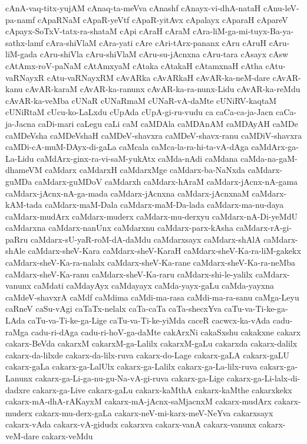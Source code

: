 {cAnA-vaq-titx-yujAM
cAnaq-ta-meVva
cAnashf
cAnayx-vi-dhA-nataH
cAnu-leV-pa-namf
cApaRNaM
cApaR-yeVtf
cApaR-yitAvx
cApalayx
cAparaH
cApareV
cApayx-SoTxV-tatx-ra-shataM
cApi
cAraH
cAraM
cAra-liM-ga-mi-tuyx-Ba-ya-sathx-lamf
cAra-shiVlaM
cAra-yati
cAre
cAri-tArx-pananx
cAru
cAruH
cAru-liM-gada
cAru-shiVla
cAru-shiVlaM
cAru-su-jAcnxna
cAru-tara
cAsayx
cAsw
cAtAmx-roV-paNaM
cAtAmxyaM
cAtaka
cAtakaH
cAtamxnaH
cAtha
cAtu-vaRNayxR
cAtu-vaRNayxRM
cAvARka
cAvARkaH
cAvAR-ka-neM-dare
cAvAR-kanu
cAvAR-karaM
cAvAR-ka-ranunx
cAvAR-ka-ra-nunx-Lidu
cAvAR-ka-reMdu
cAvAR-ka-veMba
cUNaR
cUNaRmaM
cUNaR-vA-daMte
cUNiRV-kaqtaM
cUNiRtaM
cUcu-ko-LaLxdu
cUpAda
cUpA-gi-ru-vudu
ca
caCa-ca-ja-Jacn
caCa-ja-Jacna
caDi-mari
caLegu
caLi
caM
caMDAla
caMDAnAM
caMDAyAH
caMDe
caMDeVsha
caMDeVshaH
caMDeV-shavxra
caMDeV-shavx-ranu
caMDiV-shavxra
caMDi-cA-muM-DAyx-di-gaLa
caMcala
caMca-la-ra-hi-ta-vA-dAga
caMdArx-ga-La-Lidu
caMdArx-ginx-ra-vi-saM-yukAtx
caMda-nAdi
caMdana
caMda-na-gaM-dhameVM
caMdarx
caMdarxH
caMdarxMge
caMdarx-ba-NaNxda
caMdarx-guMDa
caMdarx-guMDoV
caMdarxh
caMdarx-hAraM
caMdarx-jAcnx-nA-gama
caMdarx-jAcnx-nA-ga-mada
caMdarx-jAcnxna
caMdarx-jAcnxnaM
caMdarx-kAM-tada
caMdarx-maM-Dala
caMdarx-maM-Da-lada
caMdarx-ma-nu-daya
caMdarx-mudArx
caMdarx-muderx
caMdarx-mu-derxyu
caMdarx-nA-Di-yeMdU
caMdarxna
caMdarx-nanUnx
caMdarxnu
caMdarx-parx-kAsha
caMdarx-rA-gi-paRru
caMdarx-sU-yaR-roM-dA-daMdu
caMdarxsayx
caMdarx-shAlA
caMdarx-shAle
caMdarx-sheV-Kara
caMdarx-sheV-KaraH
caMdarx-sheV-Ka-ra-liM-gakekx
caMdarx-sheV-Ka-ra-nalalx
caMdarx-sheV-Ka-rane
caMdarx-sheV-Ka-ra-neMba
caMdarx-sheV-Ka-ranu
caMdarx-sheV-Ka-raru
caMdarx-shi-le-yalilx
caMdarx-vanunx
caMdati
caMdayAyx
caMdayayx
caMda-yayx-gaLu
caMda-yayxna
caMdeV-shavxrA
caMdf
caMdima
caMdi-ma-rasa
caMdi-ma-ra-sanu
caMga-Leyu
caRneV
caSu-vAgi
caTaTx-nelalx
caTa-caTa
caTa-shecxYva
caTu-va-Ti-ke-ga-LAda
caTu-va-Ti-ke-ga-Lige
caTu-va-Ti-ke-yiMda
caceR
cacwcx-ka-vAda
cadu-raMga
cadu-ri-dAga
cadu-ri-hoV-ga-daMte
cakArxNi
cakaSxshu
cakakxne
cakarx
cakarx-BeVda
cakarxM
cakarxM-ga-Lalilx
cakarxM-gaLu
cakarxda
cakarx-dalilx
cakarx-da-lilxde
cakarx-da-lilx-ruva
cakarx-do-Lage
cakarx-gaLA
cakarx-gaLU
cakarx-gaLa
cakarx-ga-LalUlx
cakarx-ga-Lalilx
cakarx-ga-La-lilx-ruva
cakarx-ga-Lanunx
cakarx-ga-Li-ga-nu-gu-Na-vA-gi-ruva
cakarx-ga-Lige
cakarx-ga-Li-lalx-di-dadxre
cakarx-ga-Live
cakarx-gaLu
cakarx-kaMthA
cakarx-kaMthe
cakarxkekx
cakarx-mA-dhA-rAKayxM
cakarx-mA-jAcnx-saMjacnxM
cakarx-mudArx
cakarx-muderx
cakarx-mu-derx-gaLa
cakarx-neV-mi-karx-meV-NeYva
cakarxsayx
cakarx-vAda
cakarx-vA-gidudx
cakarxva
cakarx-vanA
cakarx-vanunx
cakarx-veM-dare
cakarx-veMdu
}
